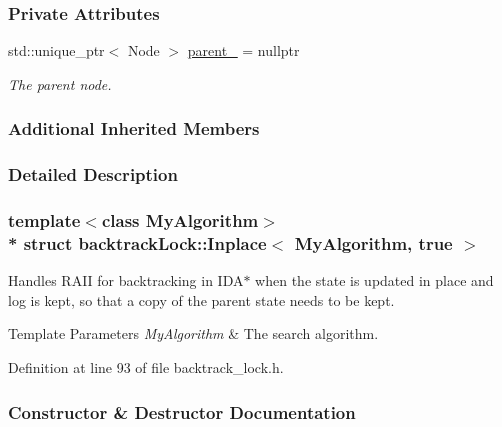 \subsubsection*{Private Attributes}
\begin{DoxyCompactItemize}
\item 
std\+::unique\+\_\+ptr$<$ Node $>$ \hyperlink{structbacktrackLock_1_1Inplace_3_01MyAlgorithm_00_01true_01_4_a590bca538ce5cd0526b1467f599eb750}{parent\+\_\+} = nullptr\hypertarget{structbacktrackLock_1_1Inplace_3_01MyAlgorithm_00_01true_01_4_a590bca538ce5cd0526b1467f599eb750}{}\label{structbacktrackLock_1_1Inplace_3_01MyAlgorithm_00_01true_01_4_a590bca538ce5cd0526b1467f599eb750}

\begin{DoxyCompactList}\small\item\em The parent node. \end{DoxyCompactList}\end{DoxyCompactItemize}
\subsubsection*{Additional Inherited Members}


\subsubsection{Detailed Description}
\subsubsection*{template$<$class My\+Algorithm$>$\\*
struct backtrack\+Lock\+::\+Inplace$<$ My\+Algorithm, true $>$}

Handles R\+A\+II for backtracking in I\+D\+A$\ast$ when the state is updated in place and log is kept, so that a copy of the parent state needs to be kept. 


\begin{DoxyTemplParams}{Template Parameters}
{\em My\+Algorithm} & The search algorithm. \\
\hline
\end{DoxyTemplParams}


Definition at line 93 of file backtrack\+\_\+lock.\+h.



\subsubsection{Constructor \& Destructor Documentation}
